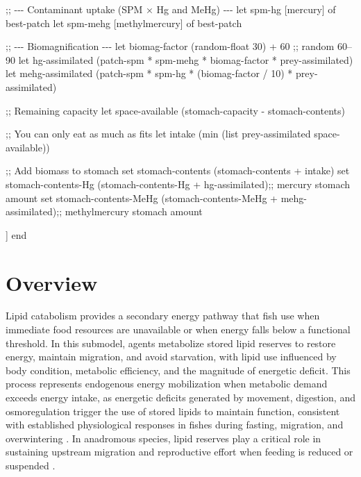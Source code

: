 \documentclass[
]{book}
\newenvironment{Shaded}{\begin{snugshade}}{\end{snugshade}}
\newcommand{\NormalTok}[1]{#1}
\begin{document}
\begin{Shaded}
\begin{Highlighting}[]
\NormalTok{    ;; {-}{-}{-} Contaminant uptake (SPM × Hg and MeHg) {-}{-}{-}}
\NormalTok{    let spm{-}hg [mercury] of best{-}patch}
\NormalTok{    let spm{-}mehg [methylmercury] of best{-}patch}
      
\NormalTok{    ;; {-}{-}{-} Biomagnification {-}{-}{-}}
\NormalTok{    let biomag{-}factor (random{-}float 30) + 60  ;; random 60–90}
\NormalTok{    let hg{-}assimilated (patch{-}spm * spm{-}mehg * biomag{-}factor * prey{-}assimilated)}
\NormalTok{    let mehg{-}assimilated (patch{-}spm * spm{-}hg * (biomag{-}factor / 10) * prey{-}assimilated)}
      
\NormalTok{    ;; Remaining capacity}
\NormalTok{    let space{-}available (stomach{-}capacity {-} stomach{-}contents)}

\NormalTok{    ;; You can only eat as much as fits}
\NormalTok{    let intake (min (list prey{-}assimilated space{-}available))}

\NormalTok{    ;; Add biomass to stomach}
\NormalTok{    set stomach{-}contents (stomach{-}contents + intake)}
\NormalTok{    set stomach{-}contents{-}Hg (stomach{-}contents{-}Hg + hg{-}assimilated);; mercury stomach amount}
\NormalTok{    set stomach{-}contents{-}MeHg (stomach{-}contents{-}MeHg + mehg{-}assimilated);; methylmercury stomach amount}

\NormalTok{  ]}
\NormalTok{end}
\end{Highlighting}
\end{Shaded}

\section{Overview}\label{overview-6}

Lipid catabolism provides a secondary energy pathway that fish use when immediate food resources are unavailable or when energy falls below a functional threshold. In this submodel, agents metabolize stored lipid reserves to restore energy, maintain migration, and avoid starvation, with lipid use influenced by body condition, metabolic efficiency, and the magnitude of energetic deficit. This process represents endogenous energy mobilization when metabolic demand exceeds energy intake, as energetic deficits generated by movement, digestion, and osmoregulation trigger the use of stored lipids to maintain function, consistent with established physiological responses in fishes during fasting, migration, and overwintering \citep{simpkins_physiological_2003}. In anadromous species, lipid reserves play a critical role in sustaining upstream migration and reproductive effort when feeding is reduced or suspended \citep{bordeleau_nutritional_2019}.
\end{document}
